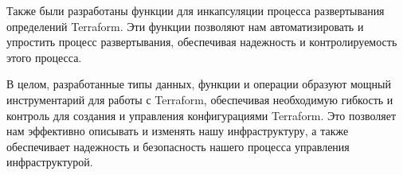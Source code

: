 Также были разработаны функции для инкапсуляции процесса развертывания
определений Terraform. Эти функции позволяют нам автоматизировать и упростить
процесс развертывания, обеспечивая надежность и контролируемость этого процесса.

В целом, разработанные типы данных, функции и операции образуют мощный
инструментарий для работы с Terraform, обеспечивая необходимую гибкость и
контроль для создания и управления конфигурациями Terraform. Это позволяет нам
эффективно описывать и изменять нашу инфраструктуру, а также обеспечивает
надежность и безопасность нашего процесса управления инфраструктурой.
